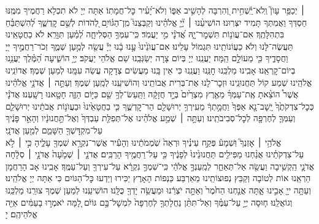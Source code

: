 \documentclass[twoside, openany, parskip=half, 11pt]{book}
\begin{document}
׀ יְכַפֵּ֥ר עָוֺן֮ וְֽלֹא־יַֽ֫שְׁחִ֥ית וְ֭הִרְבָּה לְהָשִׁ֣יב אַפּ֑וֹ וְלֹא־יָ֝עִ֗יר כׇּל־חֲמָתֽוֹ׃
אַתָּה יְיָ לֹא תִכְלָא רַחֲמֶיךָ מִמֶּֽנּוּ חַסְדְּךָ וַאֲמִתְּךָ תָּמִיד יִצְּרֽוּנוּ׃
הוֹשִׁיעֵ֨נוּ ׀ יְ֘יָ֤ אֱלֹהֵ֗ינוּ וְקַבְּצֵנוּ֮ מִֽן־הַגּ֫וֹיִ֥ם לְ֭הֹדוֹת לְשֵׁ֣ם קׇדְשֶׁ֑ךָ לְ֝הִשְׁתַּבֵּ֗חַ בִּתְהִלָּתֶֽךָ׃
אִם־עֲוֺנ֥וֹת תִּשְׁמׇר־יָ֑הּ אֲ֝דֹנָ֗י מִ֣י יַעֲמֹֽד׃ כִּֽי־עִמְּךָ֥ הַסְּלִיחָ֑ה לְ֝מַ֗עַן תִּוָּרֵֽא׃
לֹא כַחֲטָאֵֽינוּ תַּעֲשֶׂה־לָּנוּ וְלֹא כַעֲוֹנוֹתֵֽינוּ תִּגְמוֹל עָלֵינוּ׃
אִם־עֲוֺנֵ֙ינוּ֙ עָ֣נוּ בָ֔נוּ יְיָ֕ עֲשֵׂ֖ה לְמַ֣עַן שְׁמֶ֑ךָ זְכֹר־רַחֲמֶ֣יךָ ייָ֭ וַחֲסָדֶ֑יךָ כִּ֖י מֵעוֹלָ֣ם הֵֽמָּה׃
יַעֲנֵֽנוּ יְיָ בְּיוֹם צָרָה יְשַׂגְּבֵֽנוּ שֵׁם אֱלֹהֵי יַעֲקֹב׃
יְיָ֥  הוֹשִׁ֑יעָה הַ֝מֶּ֗לֶךְ יַעֲנֵ֥נוּ בְיוֹם־קׇרְאֵֽנוּ׃
אָבִֽינוּ מַלְכֵּֽנוּ חׇנֵּֽנוּ וַעֲנֵֽנוּ כִּי אֵין בָּֽנוּ מַעֲשִׂים צְדָקָה עֲשֵׂה עִמָּֽנוּ לְמַעַן שְׁמֶךָ׃
אֲדוֹנֵֽינוּ אֱלֹהֵֽינוּ שְׁמַע קוֹל תַּחֲנוּנֵֽינוּ וּזְכׇר־לָנוּ אֶת־בְּרִית אֲבוֹתֵֽינוּ וְהוֹשִׁיעֵֽנוּ לְמַֽעַן שְׁמֶךָ׃
וְעַתָּ֣ה ׀ אֲדֹנָ֣י אֱלֹהֵ֗ינוּ אֲשֶׁר֩ הוֹצֵ֨אתָ אֶֽת־עַמְּךָ֜ מֵאֶ֤רֶץ מִצְרַ֙יִם֙ בְּיָ֣ד חֲזָקָ֔ה וַתַּֽעַשׂ־לְךָ֥ שֵׁ֖ם כַּיּ֣וֹם הַזֶּ֑ה חָטָ֖אנוּ רָשָֽׁעְנוּ׃ אֲדֹנָ֗י כְּכׇל־צִדְקֹתֶ֙ךָ֙ יָֽשׇׁב־נָ֤א אַפְּךָ֙ וַחֲמָ֣תְךָ֔ מֵעִֽירְךָ֥ יְרוּשָׁלַ֖‍ִם הַר־קׇדְשֶׁ֑ךָ כִּ֤י בַחֲטָאֵ֙ינוּ֙ וּבַעֲוֺנ֣וֹת אֲבֹתֵ֔ינוּ יְרוּשָׁלַ֧‍ִם וְעַמְּךָ֛ לְחֶרְפָּ֖ה לְכׇל־סְבִיבֹתֵֽינוּ׃ וְעַתָּ֣ה ׀ שְׁמַ֣ע אֱלֹהֵ֗ינוּ אֶל־תְּפִלַּ֤ת עַבְדְּךָ֙ וְאֶל־תַּ֣חֲנוּנָ֔יו וְהָאֵ֣ר פָּנֶ֔יךָ עַל־מִקְדָּשְׁךָ֖ הַשָּׁמֵ֑ם לְמַ֖עַן אֲדֹנָֽי׃\\
אֱלֹהַ֥י ׀ אׇזְנְךָ֮ וּֽשְׁמָע֒ פְּקַ֣ח עֵינֶ֗יךָ וּרְאֵה֙ שֹֽׁמְמֹתֵ֔ינוּ וְהָעִ֕יר אֲשֶׁר־נִקְרָ֥א שִׁמְךָ֖ עָלֶ֑יהָ כִּ֣י ׀ לֹ֣א עַל־צִדְקֹתֵ֗ינוּ אֲנַ֨חְנוּ מַפִּילִ֤ים תַּחֲנוּנֵ֙ינוּ֙ לְפָנֶ֔יךָ כִּ֖י עַל־רַחֲמֶ֥יךָ הָרַבִּֽים׃ אֲדֹנָ֤י ׀ שְׁמָ֙עָה֙ אֲדֹנָ֣י ׀ סְלָ֔חָה אֲדֹנָ֛י הַֽקְשִׁ֥יבָה וַעֲשֵׂ֖ה אַל־תְּאַחַ֑ר לְמַֽעַנְךָ֣ אֱלֹהַ֔י כִּֽי־שִׁמְךָ֣ נִקְרָ֔א עַל־עִירְךָ֖ וְעַל־עַמֶּֽךָ׃
אָבִֽינוּ אָב הָרַחֲמָן הַרְאֵֽנוּ אוֹת לְטוֹבָה וְקַבֵּץ נְפוּצוֹתֵֽינוּ מֵאַרְבַּע כַּנְפוֹת הָאָרֶץ יַכִּירוּ וְיֵדְעוּ כׇּל־הַגּוֹיִם כִּי אַתָּה יְיָ אֱלֹהֵֽינוּ׃
וְעַתָּ֥ה ייָ֖ אָבִ֣ינוּ אָ֑תָּה אֲנַ֤חְנוּ הַחֹ֙מֶר֙ וְאַתָּ֣ה יֹצְרֵ֔נוּ וּמַעֲשֵׂ֥ה יָדְךָ֖ כֻּלָּֽנוּ׃ הוֹשִׁיעֵֽנוּ לְמַעַן שְׁמֶךָ צוּרֵֽנוּ מַלְכֵּֽנוּ וְגוֹאֲלֵֽנוּ׃
ח֧וּסָה יְיָ֣ עַל־עַמֶּ֗ךָ וְאַל־תִּתֵּ֨ן נַחֲלָתְךָ֤ לְחֶרְפָּה֙ לִמְשׇׁל־בָּ֣ם גּוֹיִ֔ם לָ֚מָּה יֹאמְר֣וּ בָעַמִּ֔ים אַיֵּ֖ה אֱלֹהֵיהֶֽם׃ יָ
\end{document}
